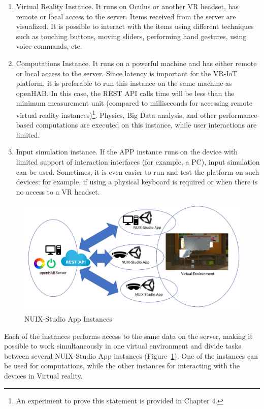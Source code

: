 \begin{enumerate}
    \item Virtual Reality Instance. It runs on Oculus or another VR headset, has remote or local access to the server. Items received from the server are visualized. It is possible to interact with the items using different techniques such as touching buttons, moving sliders, performing hand gestures, using voice commands, etc. 
    \item Computations Instance. It runs on a powerful machine and has either remote or local access to the server. Since latency is important for the VR-IoT platform, it is preferable to run this instance on the same machine as openHAB. In this case, the REST API calls time will be less than the minimum measurement unit (compared to milliseconds for accessing remote virtual reality instances)\footnote{An experiment to prove this statement is provided in Chapter 4.}. Physics, Big Data analysis, and other performance-based computations are executed on this instance, while user interactions are limited.
    \item Input simulation instance. If the APP instance runs on the device with limited support of interaction interfaces (for example, a PC), input simulation can be used. Sometimes, it is even easier to run and test the platform on such devices: for example, if using a physical keyboard is required or when there is no access to a VR headset.
\end{enumerate}

\begin{figure}
  \centering
  \includegraphics[width=0.9\linewidth]{figures/AppInstances.png}
  \caption{NUIX-Studio App Instances}
  \label{fig:AppInstances-figure}
\end{figure}

Each of the instances performs access to the same data on the server, making it possible to work simultaneously in one virtual environment and divide tasks between several NUIX-Studio App instances (Figure~\ref{fig:AppInstances-figure}). One of the instances can be used for computations, while the other instances for interacting with the devices in Virtual reality.

